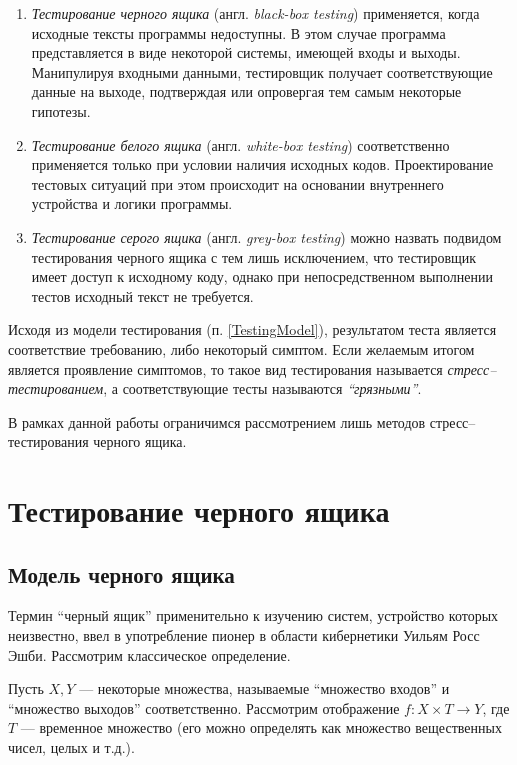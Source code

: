 \documentclass[a4paper,14pt,href]{article}
\begin{document}
\begin{enumerate}
\item
\textit{Тестирование черного ящика} (англ. \textit{black-box testing}) применяется, когда исходные тексты программы недоступны. В этом случае программа представляется в виде некоторой системы, имеющей входы и выходы. Манипулируя входными данными, тестировщик получает соответствующие данные на выходе, подтверждая или опровергая тем самым некоторые гипотезы.
\item
\textit{Тестирование белого ящика} (англ. \textit{white-box testing}) соответственно применяется только при условии наличия исходных кодов. Проектирование тестовых ситуаций при этом происходит на основании внутреннего устройства и логики программы\cite{TestingWhiteBox}.
\item
\textit{Тестирование серого ящика} (англ. \textit{grey-box testing}) можно назвать подвидом тестирования черного ящика с тем лишь исключением, что тестировщик имеет доступ к исходному коду, однако при непосредственном выполнении тестов исходный текст не требуется.
\end{enumerate}

	Исходя из модели тестирования (п. \ref{TestingModel}), результатом теста является соответствие требованию, либо некоторый симптом. Если желаемым итогом является проявление симптомов, то такое вид тестирования называется \textit{стресс--тестированием}, а соответствующие тесты называются \textit{``грязными''}.

	В рамках данной работы ограничимся рассмотрением лишь методов стресс--тестирования черного ящика.

\section{Тестирование черного ящика}
\subsection{Модель черного ящика}
Термин ``черный ящик'' применительно к изучению систем, устройство которых неизвестно, ввел в употребление пионер в области кибернетики Уильям Росс Эшби\cite{Ashby}. Рассмотрим классическое определение.

Пусть $X, Y$  --- некоторые множества, называемые ``множество входов'' и ``множество выходов'' соответственно.
Рассмотрим отображение $f : X \times T \to Y $, где $T$ --- временное множество (его можно определять как множество вещественных чисел, целых и т.д.).
\end{document}
